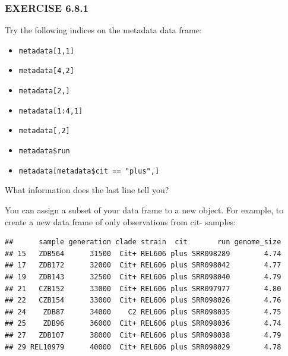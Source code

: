 \documentclass[
]{book}
\newenvironment{Shaded}{\begin{snugshade}}{\end{snugshade}}
\newcommand{\NormalTok}[1]{#1}
\newcommand{\OtherTok}[1]{\textcolor[rgb]{0.56,0.35,0.01}{#1}}
\newcommand{\SpecialCharTok}[1]{\textcolor[rgb]{0.00,0.00,0.00}{#1}}
\newcommand{\StringTok}[1]{\textcolor[rgb]{0.31,0.60,0.02}{#1}}
\providecommand{\tightlist}{%
  \setlength{\itemsep}{0pt}\setlength{\parskip}{0pt}}
\begin{document}
\hypertarget{exercise-6.8.1}{%
\subsubsection*{EXERCISE 6.8.1}\label{exercise-6.8.1}}

Try the following indices on the metadata data frame:

\begin{itemize}
\tightlist
\item
  \texttt{metadata{[}1,1{]}}
\item
  \texttt{metadata{[}4,2{]}}
\item
  \texttt{metadata{[}2,{]}}
\item
  \texttt{metadata{[}1:4,1{]}}
\item
  \texttt{metadata{[},2{]}}
\item
  \texttt{metadata\$run}
\item
  \texttt{metadata{[}metadata\$cit\ ==\ "plus",{]}}
\end{itemize}

What information does the last line tell you?

You can assign a subset of your data frame to a new object. For example, to create a new data frame of only observations from cit- samples:

\begin{Shaded}
\end{Shaded}

\begin{verbatim}
##      sample generation clade strain  cit       run genome_size
## 15   ZDB564      31500  Cit+ REL606 plus SRR098289        4.74
## 17   ZDB172      32000  Cit+ REL606 plus SRR098042        4.77
## 19   ZDB143      32500  Cit+ REL606 plus SRR098040        4.79
## 21   CZB152      33000  Cit+ REL606 plus SRR097977        4.80
## 22   CZB154      33000  Cit+ REL606 plus SRR098026        4.76
## 24    ZDB87      34000    C2 REL606 plus SRR098035        4.75
## 25    ZDB96      36000  Cit+ REL606 plus SRR098036        4.74
## 27   ZDB107      38000  Cit+ REL606 plus SRR098038        4.79
## 29 REL10979      40000  Cit+ REL606 plus SRR098029        4.78
\end{verbatim}
\end{document}
